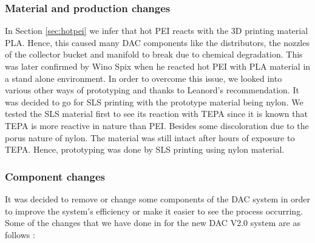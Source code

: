 \subsubsection{Material and production changes}

In Section \ref{sec:hotpei} we infer that hot PEI reacts with the 3D printing material PLA. Hence, this caused many DAC components like the distributors, the nozzles of the collector bucket and manifold to break due to chemical degradation. This was later confirmed by Wino Spix when he reacted hot PEI with PLA material in a stand alone environment. In order to overcome this issue, we looked into various other ways of prototyping and thanks to Leanord's recommendation. It was decided to go for SLS printing with the prototype material being nylon. We tested the SLS material first to see its reaction with TEPA since it is known that TEPA is more reactive in nature than PEI. Besides some discoloration due to the porus nature of nylon. The material was still intact after hours of exposure to TEPA. Hence, prototyping was done by SLS printing using nylon material.    


\subsubsection{Component changes}

It was decided to remove or change some components of the DAC system in order to improve the system's efficiency or make it easier to see the process occurring. Some of the changes that we have done in for the new DAC V2.0 system are as follows : 

